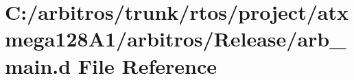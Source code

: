 \hypertarget{rtos_2project_2atxmega128_a1_2arbitros_2_release_2arb__main_8d}{\section{C\-:/arbitros/trunk/rtos/project/atxmega128\-A1/arbitros/\-Release/arb\-\_\-main.d File Reference}
\label{rtos_2project_2atxmega128_a1_2arbitros_2_release_2arb__main_8d}
}
